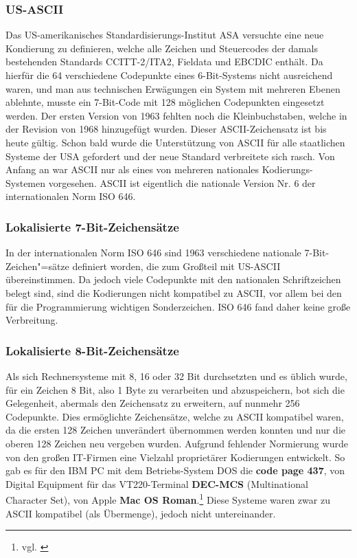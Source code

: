 \subsubsection{US-ASCII}
Das US-amerikanisches Standardisierungs-Institut ASA versuchte eine neue Kondierung zu definieren, welche alle Zeichen und Steuercodes der damals bestehenden Standards CCITT-2/ITA2, Fieldata und EBCDIC enthält. Da hierfür die 64 verschiedene Codepunkte eines 6-Bit-Systems nicht ausreichend waren, und man aus technischen Erwägungen ein System mit mehreren Ebenen ablehnte, musste ein 7-Bit-Code mit 128 möglichen Codepunkten eingesetzt werden.
Der ersten Version von 1963 fehlten noch die Kleinbuchstaben, welche in der Revision von 1968 hinzugefügt wurden. Dieser ASCII-Zeichensatz ist bis heute gültig.
Schon bald wurde die Unterstützung von ASCII für alle staatlichen Systeme der USA gefordert und der neue Standard verbreitete sich rasch.
Von Anfang an war ASCII nur als eines von mehreren nationales Kodierungs-Systemen vorgesehen. ASCII ist eigentlich die nationale Version Nr. 6 der internationalen Norm ISO 646.

\subsubsection{Lokalisierte 7-Bit-Zeichensätze}
In der internationalen Norm ISO 646 sind 1963 verschiedene nationale 7-Bit-Zeichen"=sätze definiert worden, die zum Großteil mit US-ASCII übereinstimmen.
Da jedoch viele Codepunkte mit den nationalen Schriftzeichen belegt sind, sind die Kodierungen nicht kompatibel zu ASCII, vor allem bei den für die Programmierung wichtigen Sonderzeichen.
ISO 646 fand daher keine große Verbreitung.

\subsubsection{Lokalisierte 8-Bit-Zeichensätze}
Als sich Rechnersysteme mit 8, 16 oder 32 Bit durchsetzten und es üblich wurde, für ein Zeichen 8 Bit, also 1 Byte zu verarbeiten und abzuspeichern, bot sich die Gelegenheit, abermals den Zeichensatz zu erweitern, auf nunmehr 256 Codepunkte. Dies ermöglichte Zeichensätze, welche zu ASCII kompatibel waren, da die ersten 128 Zeichen unverändert übernommen werden konnten und nur die oberen 128 Zeichen neu vergeben wurden. Aufgrund fehlender Normierung wurde von den großen IT-Firmen eine Vielzahl proprietärer Kodierungen entwickelt. So gab es für den IBM PC mit dem Betriebs-System DOS die \textbf{code page 437}, von  Digital Equipment für das  VT220-Terminal \textbf{DEC-MCS} (Multinational Character Set), von Apple \textbf{Mac OS Roman}.\footnote{vgl. \cite{IETF}}
Diese Systeme waren zwar zu ASCII kompatibel (als Übermenge), jedoch nicht untereinander.

